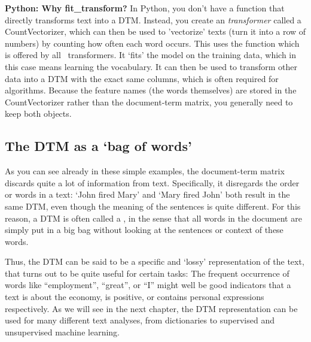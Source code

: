 
\begin{feature}
\noindent\textbf{Python: Why fit\_transform?}
In Python, you don't have a function that directly transforms text into a DTM.
Instead, you create an \emph{transformer} called a CountVectorizer,
which can then be used to 'vectorize' texts (turn it into a row of numbers)
by counting how often each word occurs.
This uses the  function which is offered by all \sklearn\ transformers.
It `fits' the model on the training data, which in this case means learning the vocabulary.
It can then be used to transform other data into a DTM with the exact same columns,
which is often required for algorithms.
Because the feature names (the words themselves) are stored in the CountVectorizer
rather than the document-term matrix, you generally need to keep both objects.
\end{feature}

\subsection{The DTM as a `bag of words'}


As you can see already in these simple examples, the document-term matrix discards quite a lot of information from text.
Specifically, it disregards the order or words in a text: `John fired Mary' and `Mary fired John' both result in the same DTM,
even though the meaning of the sentences is quite different.
For this reason, a DTM is often called a , in the sense that all words in the document are simply put in a big bag
without looking at the sentences or context of these words. 

Thus, the DTM can be said to be a specific and `lossy' representation of the text, that turns out to be quite useful for certain tasks:
The frequent occurrence of words like ``employment'', ``great'', or ``I'' might well be good indicators that a text is about the economy,
is positive, or contains personal expressions respectively.
As we will see in the next chapter, the DTM representation can be used for many different text analyses, from dictionaries to supervised and unsupervised machine learning.

